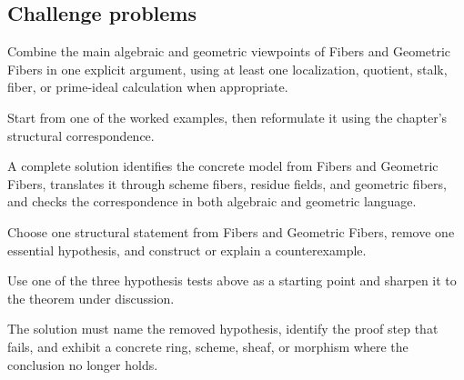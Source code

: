 \subsection*{Challenge problems}

\begin{exercise}\label{exr:vi25-expand-15}
Combine the main algebraic and geometric viewpoints of Fibers and Geometric Fibers in one explicit argument, using at least one localization, quotient, stalk, fiber, or prime-ideal calculation when appropriate.
\end{exercise}
\begin{hint}
Start from one of the worked examples, then reformulate it using the chapter's structural correspondence.
\end{hint}
\begin{solution}
A complete solution identifies the concrete model from Fibers and Geometric Fibers, translates it through scheme fibers, residue fields, and geometric fibers, and checks the correspondence in both algebraic and geometric language.
\end{solution}

\begin{exercise}\label{exr:vi25-expand-16}
Choose one structural statement from Fibers and Geometric Fibers, remove one essential hypothesis, and construct or explain a counterexample.
\end{exercise}
\begin{hint}
Use one of the three hypothesis tests above as a starting point and sharpen it to the theorem under discussion.
\end{hint}
\begin{solution}
The solution must name the removed hypothesis, identify the proof step that fails, and exhibit a concrete ring, scheme, sheaf, or morphism where the conclusion no longer holds.
\end{solution}

